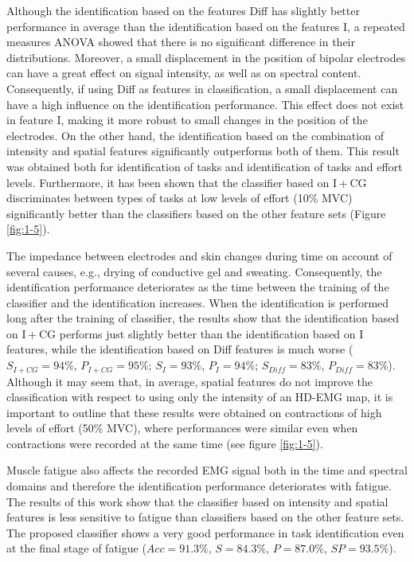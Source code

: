 Although the identification based on the features Diff has slightly better performance in average than the identification based on the features I, a repeated measures ANOVA showed that there is no significant difference in their distributions. Moreover, a small displacement in the position of bipolar electrodes can have a great effect on signal intensity, as well as on spectral content. Consequently, if using Diff as features in classification, a small displacement can have a high influence on the identification performance. This effect does not exist in feature I, making it more robust to small changes in the position of the electrodes. On the other hand, the identification based on the combination of intensity and spatial features significantly outperforms both of them. This result was obtained both for identification of tasks and identification of tasks and effort levels. Furthermore, it has been shown that the classifier based on I + CG discriminates between types of tasks at low levels of effort (10\% MVC) significantly better than the classifiers based on the other feature sets (Figure \ref{fig:1-5}).

The impedance between electrodes and skin changes during time on account of several causes, e.g., drying of conductive gel and sweating. Consequently, the identification performance deteriorates as the time between the training of the classifier and the identification increases. When the identification is performed long after the training of classifier, the results show that the identification based on I + CG performs just slightly better than the identification based on I features, while the identification based on Diff features is much worse ($S_{I+CG} = 94\%$, $P_{I+CG} = 95\%$; $S_I = 93\%$, $P_I = 94\%$; $S_{Diff} = 83\%$, $P_{Diff} = 83\%$). Although it may seem that, in average, spatial features do not improve the classification with respect to using only the intensity of an HD-EMG map, it is important to outline that these results were obtained on contractions of high levels of effort (50\% MVC), where performances were similar even when contractions were recorded at the same time (see figure \ref{fig:1-5}).

Muscle fatigue also affects the recorded EMG signal both in the time and spectral domains and therefore the identification performance deteriorates with fatigue. The results of this work show that the classifier based on intensity and spatial features is less sensitive to fatigue than classifiers based on the other feature sets. The proposed classifier shows a very good performance in task identification even at the final stage of fatigue ($Acc = 91.3\%$, $S = 84.3\%$, $P = 87.0\%$, $SP = 93.5\%$).

